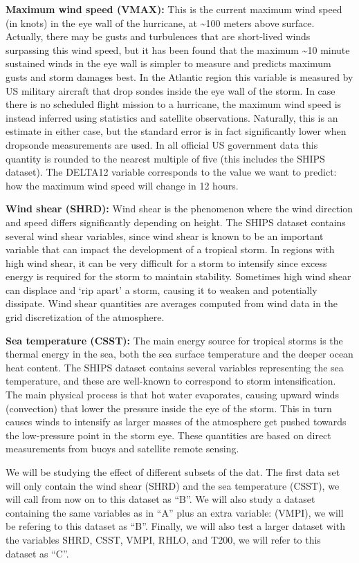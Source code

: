 \documentclass[
]{article}
\begin{document}
\textbf{Maximum wind speed (VMAX):} This is the current maximum wind
speed (in knots) in the eye wall of the hurricane, at \textasciitilde100
meters above surface. Actually, there may be gusts and turbulences that
are short-lived winds surpassing this wind speed, but it has been found
that the maximum \textasciitilde10 minute sustained winds in the eye
wall is simpler to measure and predicts maximum gusts and storm damages
best. In the Atlantic region this variable is measured by US military
aircraft that drop sondes inside the eye wall of the storm. In case
there is no scheduled flight mission to a hurricane, the maximum wind
speed is instead inferred using statistics and satellite observations.
Naturally, this is an estimate in either case, but the standard error is
in fact significantly lower when dropsonde measurements are used. In all
official US government data this quantity is rounded to the nearest
multiple of five (this includes the SHIPS dataset). The DELTA12 variable
corresponds to the value we want to predict: how the maximum wind speed
will change in 12 hours.

\textbf{Wind shear (SHRD):} Wind shear is the phenomenon where the wind
direction and speed differs significantly depending on height. The SHIPS
dataset contains several wind shear variables, since wind shear is known
to be an important variable that can impact the development of a
tropical storm. In regions with high wind shear, it can be very
difficult for a storm to intensify since excess energy is required for
the storm to maintain stability. Sometimes high wind shear can displace
and `rip apart' a storm, causing it to weaken and potentially dissipate.
Wind shear quantities are averages computed from wind data in the grid
discretization of the atmosphere.

\textbf{Sea temperature (CSST):} The main energy source for tropical
storms is the thermal energy in the sea, both the sea surface
temperature and the deeper ocean heat content. The SHIPS dataset
contains several variables representing the sea temperature, and these
are well-known to correspond to storm intensification. The main physical
process is that hot water evaporates, causing upward winds (convection)
that lower the pressure inside the eye of the storm. This in turn causes
winds to intensify as larger masses of the atmosphere get pushed towards
the low-pressure point in the storm eye. These quantities are based on
direct measurements from buoys and satellite remote sensing.

We will be studying the effect of different subsets of the dat. The
first data set will only contain the wind shear (SHRD) and the sea
temperature (CSST), we will call from now on to this dataset as ``B''.
We will also study a dataset containing the same variables as in ``A''
plus an extra variable: (VMPI), we will be refering to this dataset as
``B''. Finally, we will also test a larger dataset with the variables
SHRD, CSST, VMPI, RHLO, and T200, we will refer to this dataset as
``C''.
\end{document}
